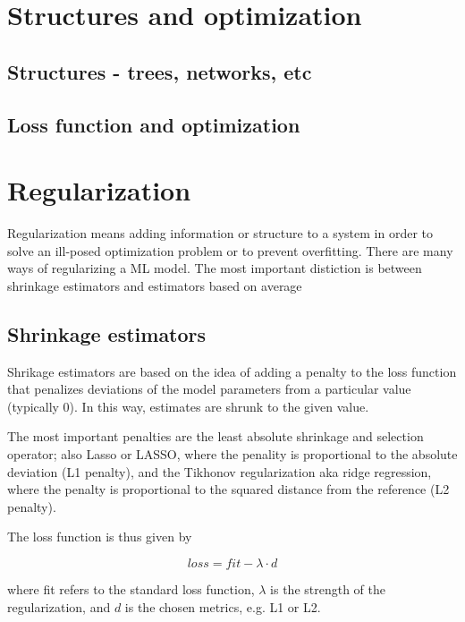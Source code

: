 \documentclass[a4paper,twoside]{tufte-book}\usepackage[]{graphicx}\usepackage[]{color}
\begin{document}


\section{Structures and optimization}

\subsection{Structures - trees, networks, etc}


\subsection{Loss function and optimization}


\section{Regularization}

Regularization means adding information or structure to a system in order to solve an ill-posed optimization problem or to prevent overfitting. There are many ways of regularizing a ML model. The most important distiction is between shrinkage estimators and estimators based on average 

\subsection{Shrinkage estimators} 

Shrikage estimators are based on the idea of adding a penalty to the loss function that penalizes deviations of the model parameters from a particular value (typically 0). In this way, estimates are shrunk to the given value.

The most important penalties are the least absolute shrinkage and selection operator; also Lasso or LASSO, where the penality is proportional to the absolute deviation (L1 penalty), and the Tikhonov regularization aka ridge regression, where the penalty is proportional to the squared distance from the reference (L2 penalty). 

The loss function is thus given by 

\begin{equation}
loss = fit - \lambda \cdot d
\end{equation}

where fit refers to the standard loss function, $\lambda$ is the strength of the regularization, and $d$ is the chosen metrics, e.g. L1 or L2.
\end{document}
